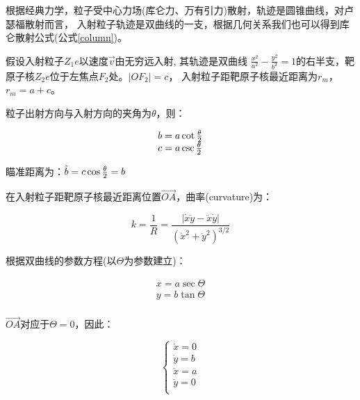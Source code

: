 
根据经典力学，粒子受中心力场(库仑力、万有引力)散射，轨迹是圆锥曲线，对卢瑟福散射而言，
入射粒子轨迹是双曲线的一支，根据几何关系我们也可以得到库仑散射公式(公式\ref{column})。

假设入射粒子$Z_{1}e$以速度$\vec v$由无穷远入射, 其轨迹是双曲线
$\frac{{x^2 }}{{a^2 }} - \frac{{y^2 }}{{b^2 }} =
1$的右半支，靶原子核$Z_{2}e$位于左焦点$F_2$处。$\left| {OF_2 }
\right| = c$， 入射粒子距靶原子核最近距离为$r_m$，$r_m  = a + c$。

粒子出射方向与入射方向的夹角为$\theta $，则：

\begin{equation*}
\begin{array}{l}
b = a\cot {\textstyle{\theta  \over 2}}\\
c = a\csc {\textstyle{\theta  \over 2}}\\
\end{array}
\end{equation*}

瞄准距离为：$\tilde b = c\cos {\textstyle{\theta  \over 2}} = b$



在入射粒子距靶原子核最近距离位置$\overrightarrow {OA}
$，曲率(curvature)为：

\begin{equation*}
k = \frac{1}{R} = \frac{{\left| {\dot x\ddot y - \ddot x\dot y}
\right|}}{{\left( {\dot x^2  + \dot y^2 } \right)^{3/2} }}
\end{equation*}


根据双曲线的参数方程(以$\Theta$为参数建立)：

\begin{equation*}
\begin{array}{l}
 x = a\sec \Theta  \\
 y = b\tan \Theta  \\
\end{array}
\end{equation*}

$\overrightarrow {OA} $对应于$\Theta  = 0$，因此：

\begin{equation*}
\left\{ \begin{array}{l}
 \dot x = 0 \\
 \dot y = b \\
 \ddot x = a \\
 \ddot y = 0 \\
 \end{array} \right.
\end{equation*}

